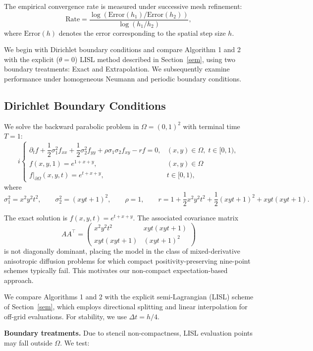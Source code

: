 \documentclass[11pt]{article}
\theoremstyle{mythm}
\theoremstyle{definition}
\begin{document}
	The empirical convergence rate is measured under successive mesh refinement:
	\[
	\text{Rate}=
	\frac{\log\!\left( \text{Error}(h_1) / \text{Error}(h_2) \right)}
	{\log(h_1/h_2)},
	\]
	where $\text{Error}(h)$ denotes the error corresponding to the spatial step size $h$.
	
	
	
	We begin with Dirichlet boundary conditions and compare  Algorithm 1 and 2  with the explicit ($\theta=0$) LISL method described in Section~\ref{sem}, using two boundary treatments: Exact and Extrapolation. We subsequently examine performance under homogeneous Neumann and periodic boundary conditions.
	\subsection{Dirichlet Boundary Conditions}
	
	We solve the backward parabolic problem in $\Omega=(0,1)^2$ with terminal time $T=1$:
	\[i
	\begin{cases}
		\partial_t f
		+\dfrac12\sigma_1^2 f_{xx}
		+\dfrac12\sigma_2^2 f_{yy}
		+\rho\sigma_1\sigma_2 f_{xy}
		- r f = 0,
		& (x,y)\in\Omega,\; t\in[0,1),\\[4pt]
		f(x,y,1)=e^{1+x+y},&(x,y)\in\Omega\\[4pt]
		f|_{\partial\Omega}(x,y,t)=e^{t+x+y}, &t\in[0,1),
	\end{cases}
	\]
	where
	\[
	\sigma_1^2=x^2y^2t^2,\qquad
	\sigma_2^2=(xyt+1)^2,\qquad
	\rho=1,\qquad
	r=1+\dfrac12x^2y^2t^2+\dfrac12(xyt+1)^2+xyt(xyt+1).
	\]
	
	The exact solution is $f(x,y,t)=e^{t+x+y}$.  
	The associated covariance matrix 
	\[
	AA^\top=\begin{pmatrix}
		x^2y^2t^2 & xyt(xyt+1)\\
		xyt(xyt+1) & (xyt+1)^2
	\end{pmatrix}
	\]
	is not diagonally dominant, placing the model in the class of mixed-derivative anisotropic diffusion problems for which compact positivity-preserving nine-point schemes typically fail. This motivates our non-compact expectation-based approach.
	
	
	We compare Algorithms 1 and 2 with the explicit semi-Lagrangian (LISL) scheme of Section~\ref{sem}, which employs directional splitting and linear interpolation for off-grid evaluations. For stability, we use $\Delta t = h/4$.
	
	\textbf{Boundary treatments.}
	Due to stencil non-compactness, LISL evaluation points may fall outside $\Omega$. We test:
	
\end{document}
